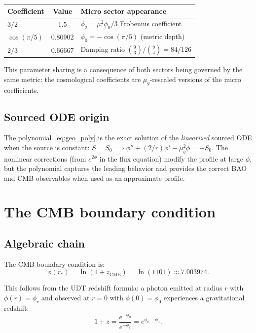 \documentclass[11pt,letterpaper]{article}
\numberwithin{equation}{section}
\begin{document}
\begin{center}
\begin{tabular}{lcl}
\toprule
Coefficient & Value & Micro sector appearance \\
\midrule
$3/2$ & 1.5 & $\phi_2 = \mu^2\phi_0/3$ Frobenius coefficient \\
$\cos(\pi/5)$ & 0.80902 & $\phi_0 = -\cos(\pi/5)$ (metric depth) \\
$2/3$ & 0.66667 & Damping ratio $\binom{9}{3}/\binom{9}{4} = 84/126$ \\
\bottomrule
\end{tabular}
\end{center}

This parameter sharing is a consequence of both sectors being governed
by the same metric: the cosmological coefficients are $\mu_g$-rescaled
versions of the micro coefficients.

\subsection{Sourced ODE origin}

The polynomial~\eqref{eq:geo_poly} is the exact solution of the
\emph{linearized} sourced ODE when the source is constant:
$S = S_0 \implies \phi'' + (2/r)\phi' - \mu_g^2\phi = -S_0$. The
nonlinear corrections (from $e^{2\phi}$ in the flux equation) modify the
profile at large $\phi$, but the polynomial captures the leading behavior
and provides the correct BAO and CMB observables when used as an
approximate profile.

\section{The CMB boundary condition}
\label{sec:cmb_bc}

\subsection{Algebraic chain}

The CMB boundary condition is:
\begin{equation}
\label{eq:cmb_bc}
\boxed{
  \phi(r_*) = \ln(1 + z_\mathrm{CMB}) = \ln(1101) \approx 7.003974.
}
\end{equation}

This follows from the UDT redshift formula: a photon emitted at radius
$r$ with $\phi(r) = \phi_r$ and observed at $r = 0$ with $\phi(0) = \phi_0$
experiences a gravitational redshift:
\begin{equation}
\label{eq:redshift}
  1 + z = \frac{e^{-\phi_0}}{e^{-\phi_r}} = e^{\phi_r - \phi_0}.
\end{equation}
\end{document}
